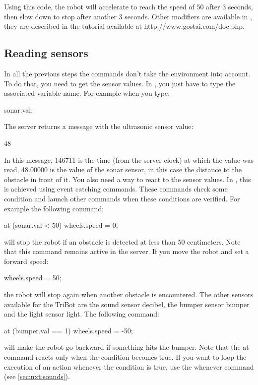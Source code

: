 Using this code, the robot will accelerate to reach the speed of 50 after 3
seconds, then slow down to stop after another 3 seconds.
Other modifiers are available in \urbi, they are described in the \urbi tutorial
available at http://www.gostai.com/doc.php.

\subsection{Reading sensors}
In all the previous steps the commands don't take the environment into account.
To do that, you need to get the sensor values. In \urbi, you just have to type
the associated variable name. For example when you type:
\begin{urbiunchecked}
sonar.val;
\end{urbiunchecked}

The server returns a message with the ultrasonic sensor value:
\begin{urbiunchecked}
[00146711] 48
\end{urbiunchecked}

In this message, 146711 is the time (from the server clock) at which the value
was read, 48.00000 is the value of the sonar sensor, in this case the distance
to the obstacle in front of it.
You also need a way to react to the sensor values. In \urbi, this is achieved
using event catching commands. These commands check some condition and launch
other commands when these conditions are verified. For example the following
command:
\begin{urbiunchecked}
at (sonar.val < 50)
  wheels.speed = 0;
\end{urbiunchecked}

will stop the robot if an obstacle is detected at less than 50 centimeters.
Note that this command remains active in the server. If you move the robot and
set a forward speed:
\begin{urbiunchecked}
wheels.speed = 50;
\end{urbiunchecked}

the robot will stop again when another obstacle is encountered.
The other sensors available for the TriBot are the sound sensor decibel, the
bumper sensor bumper and the light sensor light. The following command:
\begin{urbiunchecked}
at (bumper.val == 1)
  wheels.speed = -50;
\end{urbiunchecked}

will make the robot go backward if something hits the bumper.
Note that the at command reacts only when the condition becomes true. If you
want to loop the execution of an action whenever the condition is true, use the
whenever command (see \autoref{sec:nxt:sounds}).


